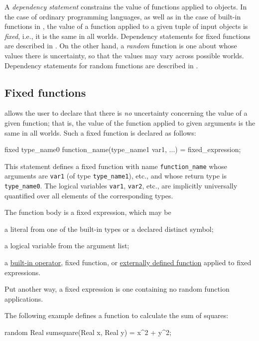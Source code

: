 A {\em dependency statement} constrains the value of functions applied to objects. In the case of ordinary programming languages,
as well as in the case of built-in functions in \bl, the value of a function applied to a given tuple of input objects is {\em fixed},
i.e., it is the same in all worlds. Dependency statements for fixed functions are described in . On the other hand, a {\em random} function
is one about whose values there is uncertainty, so that the values may vary across possible worlds. Dependency statements for random functions are described in .



\subsection{Fixed functions}\label{fixed-section}

\bl allows the user to declare that there is {\em no} uncertainty concerning the value of a given function; that is, the
value of the function applied to given arguments is the same in all worlds. Such a fixed function is declared as follows:
\begin{blogcode}
fixed type_name0 function_name(type_name1 var1, ...) = 
  fixed_expression;
\end{blogcode}
This statement defines a fixed function with name \texttt{function\_name} whose arguments are {\tt var1} (of type \verb|type_name1|), etc.,
and whose return type is \verb|type_name0|. The logical variables {\tt var1}, {\tt var2}, etc., are implicitly universally quantified over
all elements of the corresponding types.

The function body is a fixed expression, which may be
\begin{itemize*}
\item a literal from one of the built-in types or a declared distinct symbol;
\item a logical variable from the argument list;
\item a \hyperref[builtin-operator-appendix]{built-in operator}, fixed function, or \hyperref[external-function-appendix]{externally defined function} applied to fixed expressions.
\end{itemize*}
Put another way, a fixed expression is one containing no random function applications.

The following example defines a function to calculate the sum of squares:
\begin{blogcode}
random Real sumsquare(Real x, Real y) = x^2 + y^2;
\end{blogcode}

